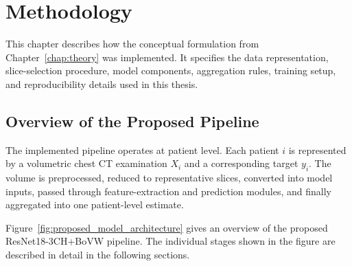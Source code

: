 \chapter{Methodology}
\label{chap:methodology}

This chapter describes how the conceptual formulation from Chapter~\ref{chap:theory} was implemented. It specifies the data representation, slice-selection procedure, model components, aggregation rules, training setup, and reproducibility details used in this thesis.


\section{Overview of the Proposed Pipeline}
\label{sec:overview_of_the_proposed_pipeline}
The implemented pipeline operates at patient level. Each patient \(i\) is represented by a volumetric chest CT examination \(X_i\) and a corresponding target \(y_i\). The volume is preprocessed, reduced to representative slices, converted into model inputs, passed through feature-extraction and prediction modules, and finally aggregated into one patient-level estimate.

Figure~\ref{fig:proposed_model_architecture} gives an overview of the proposed ResNet18-3CH+BoVW pipeline. The individual stages shown in the figure are described in detail in the following sections.

